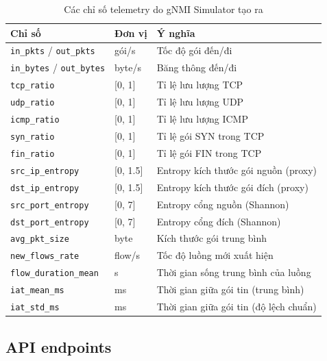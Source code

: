 \documentclass[12pt,a4paper]{article}
\begin{document}
\begin{table}[H]
\centering
\caption{Các chỉ số telemetry do gNMI Simulator tạo ra}
\label{tab:gnmi_metrics}
\begin{tabular}{llp{7cm}}
\toprule
\textbf{Chỉ số} & \textbf{Đơn vị} & \textbf{Ý nghĩa} \\
\midrule
\texttt{in\_pkts} / \texttt{out\_pkts}  & gói/s & Tốc độ gói đến/đi \\
\texttt{in\_bytes} / \texttt{out\_bytes} & byte/s & Băng thông đến/đi \\
\texttt{tcp\_ratio} & [0, 1] & Tỉ lệ lưu lượng TCP \\
\texttt{udp\_ratio} & [0, 1] & Tỉ lệ lưu lượng UDP \\
\texttt{icmp\_ratio} & [0, 1] & Tỉ lệ lưu lượng ICMP \\
\texttt{syn\_ratio} & [0, 1] & Tỉ lệ gói SYN trong TCP \\
\texttt{fin\_ratio} & [0, 1] & Tỉ lệ gói FIN trong TCP \\
\texttt{src\_ip\_entropy} & [0, 1.5] & Entropy kích thước gói nguồn (proxy) \\
\texttt{dst\_ip\_entropy} & [0, 1.5] & Entropy kích thước gói đích (proxy) \\
\texttt{src\_port\_entropy} & [0, 7] & Entropy cổng nguồn (Shannon) \\
\texttt{dst\_port\_entropy} & [0, 7] & Entropy cổng đích (Shannon) \\
\texttt{avg\_pkt\_size} & byte & Kích thước gói trung bình \\
\texttt{new\_flows\_rate} & flow/s & Tốc độ luồng mới xuất hiện \\
\texttt{flow\_duration\_mean} & s & Thời gian sống trung bình của luồng \\
\texttt{iat\_mean\_ms} & ms & Thời gian giữa gói tin (trung bình) \\
\texttt{iat\_std\_ms} & ms & Thời gian giữa gói tin (độ lệch chuẩn) \\
\bottomrule
\end{tabular}
\end{table}

\subsection{API endpoints}
\end{document}

